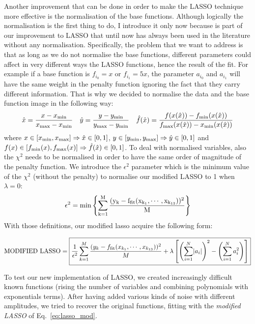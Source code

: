 \documentclass[11pt]{article}
\begin{document}
Another improvement that can be done in order to make the LASSO technique more effective is the normalisation of the base functions. 
Although logically the normalisation is the first thing to do, I introduce it only now because is part of our improvement to LASSO that until now has always been used in the literature without any normalisation.
Specifically, the problem that we want to address is that as long as we do not normalise the base functions, different parameters could affect in very different ways the LASSO functions, hence the result of the fit. For example if a base function is $f_{i_0} = x$ or $f_{i_1} = 5x$, the parameter $a_{i_0}$ and $a_{i_1}$ will have the same weight in the penalty function ignoring the fact that they carry different information. That is why we decided to normalise the data and the base function image in the following way:
\begin{equation}
\hat x = \frac{x - x_{\rm{min}}}{x_{\rm{max}}-x_{\rm{min}}} \quad
\hat y = \frac{y - y_{\rm{min}}}{y_{\rm{max}}-y_{\rm{min}}} \quad
\hat f(\hat x) = \frac{f(x(\hat x)) - f_{\rm{min}}(x(\hat x))}{f_{\rm{max}}(x(\hat x))-x_{\rm{min}}(x(\hat x))}
\end{equation}
%
where $x \in [x_{\rm{min}},x_{\rm{max}}] \Rightarrow \hat x \in [0,1]$, $y \in [y_{\rm{min}},y_{\rm{max}}] \Rightarrow \hat y \in [0,1]$ and $f(x) \in [f_{\rm{min}}(x),f_{\rm{max}}(x)] \Rightarrow \hat f (\hat x) \in [0,1]$.
%
To deal with normalised variables, also the $\chi^2$ needs to be normalised in order to have the same order of magnitude of the penalty function. We introduce the $\epsilon^2$ parameter which is the minimum value of the $\chi^2$ (without the penalty) to normalise our modified LASSO to 1 when $\lambda =0$:
%
\begin{equation}
\epsilon^2 = \rm{min}\left\lbrace \sum_{k=1}^M\frac{(y_k - f_{\rm{fit}}(x_{k_1},\cdots,x_{k_{13}}))^2}{M}
 \right\rbrace
\end{equation}
%
With those definitions, our modified lasso acquire the following form:

\begin{equation}
\label{eq:lasso_mod}
\text{MODIFIED LASSO} = \boxed{\frac{1}{\epsilon^2}  \sum_{k=1}^M\frac{(y_k - f_{\rm{fit}}(x_{k_1},\cdots,x_{k_{13}}))^2}{M} + \lambda \left[ \left( \sum_{i=1}^N \lvert a_i \rvert \right)^2 - \left(\sum_{i=1}^N a_i^2\right)\right]}
\end{equation}

 To test our new implementation of LASSO, we created increasingly difficult known functions (rising the number of variables and combining polynomials with exponentials terms). After having added various kinds of noise with different amplitudes, we tried to recover the original functions, fitting with the \emph{modified LASSO} of Eq.~\ref{eq:lasso_mod}. 
 
\end{document}
